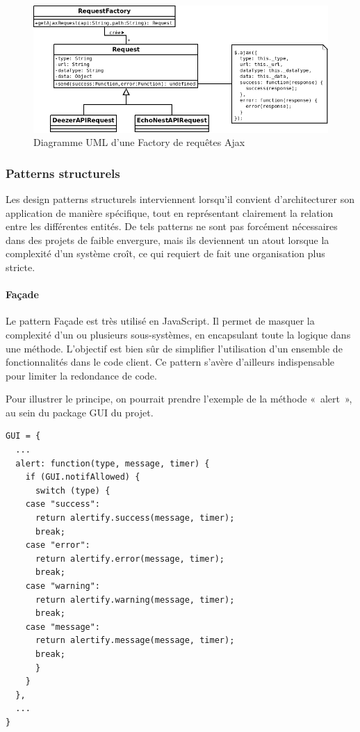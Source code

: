 \documentclass[a4paper,12pt]{article}
\begin{document}
\begin{figure}[!h]
  \begin{center}
    \includegraphics[scale=0.5]{Factory.png}
    \caption{Diagramme UML d'une Factory de requêtes Ajax}
  \end{center}
\end{figure}

\subsubsection{Patterns structurels}

Les design patterns structurels interviennent lorsqu'il convient d'architecturer son application de manière spécifique, tout en représentant clairement la relation entre les différentes entités. De tels patterns ne sont pas forcément nécessaires dans des projets de faible envergure, mais ils deviennent un atout lorsque la complexité d'un système croît, ce qui requiert de fait une organisation plus stricte.

\paragraph{Façade}

Le pattern Façade est très utilisé en JavaScript. Il permet de masquer la complexité d'un ou plusieurs sous-systèmes, en encapsulant toute la logique dans une méthode. L'objectif est bien sûr de simplifier l'utilisation d'un ensemble de fonctionnalités dans le code client. Ce pattern s'avère d'ailleurs indispensable pour limiter la redondance de code.

Pour illustrer le principe, on pourrait prendre l'exemple de la méthode «~alert~», au sein du package GUI du projet.

\begin{lstlisting}
GUI = {
  ...
  alert: function(type, message, timer) {
    if (GUI.notifAllowed) {
      switch (type) {
	case "success":
	  return alertify.success(message, timer);
	  break;
	case "error":
	  return alertify.error(message, timer);
	  break;
	case "warning":
	  return alertify.warning(message, timer);
	  break;
	case "message":
	  return alertify.message(message, timer);
	  break;
      }
    }
  },
  ...
}
\end{lstlisting}
\end{document}
